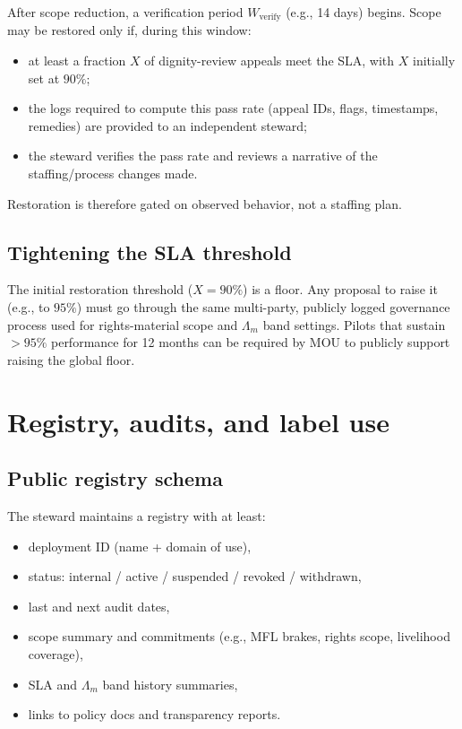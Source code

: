 \documentclass[11pt]{article}
\begin{document}
After scope reduction, a verification period \(W_{\text{verify}}\) (e.g., 14 days) begins.
Scope may be restored only if, during this window:

\begin{itemize}[leftmargin=*]
  \item at least a fraction \(X\) of dignity-review appeals meet the SLA, with \(X\) initially set at \(90\%\);
  \item the logs required to compute this pass rate (appeal IDs, flags, timestamps, remedies) are provided to an independent steward;
  \item the steward verifies the pass rate and reviews a narrative of the staffing/process changes made.
\end{itemize}

Restoration is therefore gated on observed behavior, not a staffing plan.

\subsection{Tightening the SLA threshold}

The initial restoration threshold (\(X = 90\%\)) is a floor.
Any proposal to raise it (e.g., to \(95\%\)) must go through the same multi-party, publicly logged governance process used for rights-material scope and \(\Lambda_m\) band settings.
Pilots that sustain \(>95\%\) performance for 12 months can be required by MOU to publicly support raising the global floor.

\section{Registry, audits, and label use}

\subsection{Public registry schema}

The steward maintains a registry with at least:

\begin{itemize}[leftmargin=*]
  \item deployment ID (name + domain of use),
  \item status: internal / active / suspended / revoked / withdrawn,
  \item last and next audit dates,
  \item scope summary and commitments (e.g., MFL brakes, rights scope, livelihood coverage),
  \item SLA and \(\Lambda_m\) band history summaries,
  \item links to policy docs and transparency reports.
\end{itemize}
\end{document}
